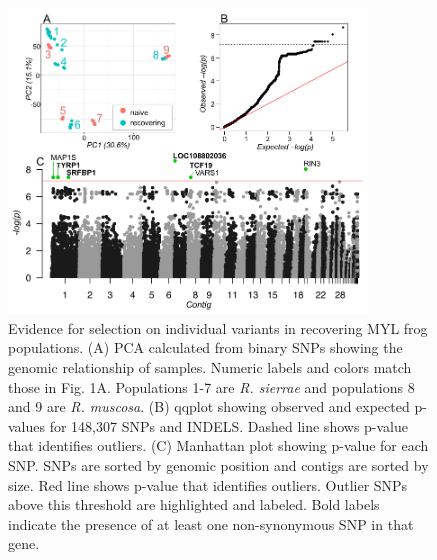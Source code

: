 \documentclass[9pt,twoside,lineno]{pnas-new}
\begin{document}
\begin{figure}

{\centering \includegraphics[width=0.85\textwidth]{figures/pca_qq_manhattan.png}

}

\caption{\label{fig-selectionresults}Evidence for selection on
individual variants in recovering MYL frog populations. (A) PCA
calculated from binary SNPs showing the genomic relationship of samples.
Numeric labels and colors match those in
Fig. 1A. Populations 1-7 are \emph{R.
sierrae} and populations 8 and 9 are \emph{R. muscosa}. (B) qqplot
showing observed and expected p-values for 148,307 SNPs and INDELS.
Dashed line shows p-value that identifies outliers. (C) Manhattan plot
showing p-value for each SNP. SNPs are sorted by genomic position and
contigs are sorted by size. Red line shows p-value that identifies
outliers. Outlier SNPs above this threshold are highlighted and labeled.
Bold labels indicate the presence of at least one non-synonymous SNP in
that gene.}

\end{figure}\clearpage

\newpage
\end{document}
